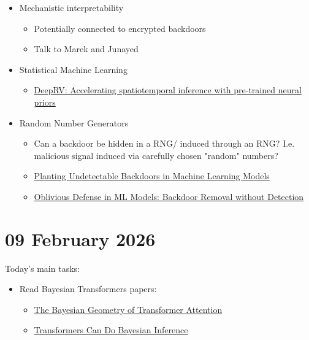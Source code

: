\documentclass[12pt,a4paper,twoside]{article}
\begin{document}
\begin{meetingsummary}
\begin{itemize}
\begin{itemize}
\begin{itemize}
\begin{itemize}
				                  \end{itemize}
			            \end{itemize}
		      \end{itemize}
		\item Mechanistic interpretability
		      \begin{itemize}
			      \item Potentially connected to encrypted backdoors
			      \item Talk to Marek and Junayed
		      \end{itemize}
		\item Statistical Machine Learning
		      \begin{itemize}
			      \item \href{https://arxiv.org/abs/2503.21473}{DeepRV: Accelerating spatiotemporal inference with pre-trained neural priors}
		      \end{itemize}
		\item Random Number Generators
		      \begin{itemize}
			      \item Can a backdoor be hidden in a RNG/ induced through an RNG? I.e. malicious signal induced via carefully chosen "random" numbers?
			      \item \href{https://arxiv.org/abs/2204.06974}{Planting Undetectable Backdoors in Machine Learning Models}
			      \item \href{https://dl.acm.org/doi/10.1145/3717823.3718245}{Oblivious Defense in ML Models: Backdoor Removal without Detection}
		      \end{itemize}
	\end{itemize}

\end{meetingsummary}

\section{09 February 2026}
Today's main tasks:
\begin{itemize}[leftmargin=*]
	\item Read Bayesian Transformers papers:
	      \begin{itemize}
		      \item \href{https://arxiv.org/abs/2512.22471}{The Bayesian Geometry of Transformer Attention}
		      \item \href{https://arxiv.org/abs/2112.10510}{Transformers Can Do Bayesian Inference}
	      \end{itemize}

\end{itemize}
\end{document}
